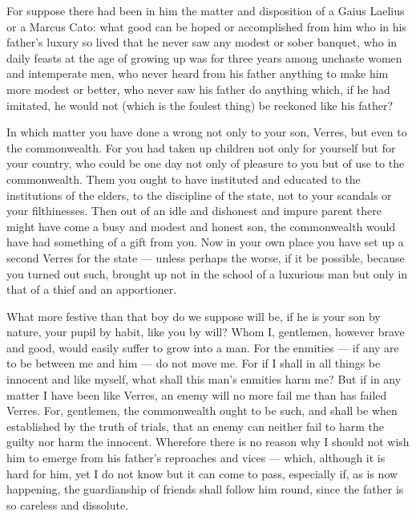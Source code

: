 For suppose there had been in him the matter and disposition of a Gaius Laelius or a Marcus Cato: what good can be hoped or accomplished from him who in his father's luxury so lived that he never saw any modest or sober banquet, who in daily feasts at the age of growing up was for three years among unchaste women and intemperate men, who never heard from his father anything to make him more modest or better, who never saw his father do anything which, if he had imitated, he would not (which is the foulest thing) be reckoned like his father?

 In which matter you have done a wrong not only to your son, Verres, but even to the commonwealth. For you had taken up children not only for yourself but for your country, who could be one day not only of pleasure to you but of use to the commonwealth. Them you ought to have instituted and educated to the institutions of the elders, to the discipline of the state, not to your scandals or your filthinesses. Then out of an idle and dishonest and impure parent there might have come a busy and modest and honest son, the commonwealth would have had something of a gift from you. Now in your own place you have set up a second Verres for the state --- unless perhaps the worse, if it be possible, because you turned out such, brought up not in the school of a luxurious man but only in that of a thief and an apportioner.

 What more festive than that boy do we suppose will be, if he is your son by nature, your pupil by habit, like you by will? Whom I, gentlemen, however brave and good, would easily suffer to grow into a man. For the enmities --- if any are to be between me and him --- do not move me. For if I shall in all things be innocent and like myself, what shall this man's enmities harm me? But if in any matter I have been like Verres, an enemy will no more fail me than has failed Verres. For, gentlemen, the commonwealth ought to be such, and shall be when established by the truth of trials, that an enemy can neither fail to harm the guilty nor harm the innocent. Wherefore there is no reason why I should not wish him to emerge from his father's reproaches and vices --- which, although it is hard for him, yet I do not know but it can come to pass, especially if, as is now happening, the guardianship of friends shall follow him round, since the father is so careless and dissolute.


